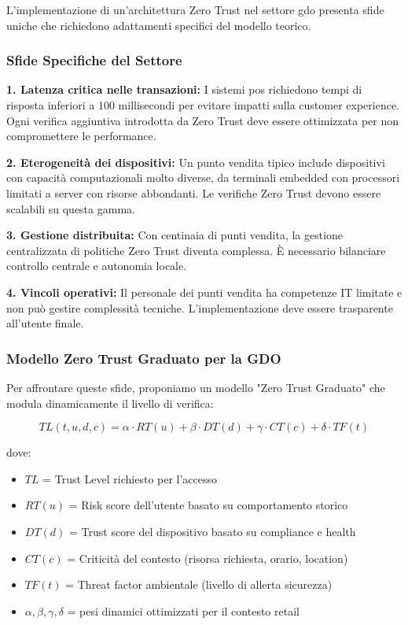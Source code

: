 L'implementazione di un'architettura Zero Trust nel settore \gls{gdo} presenta sfide uniche che richiedono adattamenti specifici del modello teorico.

\subsubsection{Sfide Specifiche del Settore}

\textbf{1. Latenza critica nelle transazioni:} I sistemi \gls{pos} richiedono tempi di risposta inferiori a 100 millisecondi per evitare impatti sulla customer experience. Ogni verifica aggiuntiva introdotta da Zero Trust deve essere ottimizzata per non compromettere le performance.

\textbf{2. Eterogeneità dei dispositivi:} Un punto vendita tipico include dispositivi con capacità computazionali molto diverse, da terminali embedded con processori limitati a server con risorse abbondanti. Le verifiche Zero Trust devono essere scalabili su questa gamma.

\textbf{3. Gestione distribuita:} Con centinaia di punti vendita, la gestione centralizzata di politiche Zero Trust diventa complessa. È necessario bilanciare controllo centrale e autonomia locale.

\textbf{4. Vincoli operativi:} Il personale dei punti vendita ha competenze IT limitate e non può gestire complessità tecniche. L'implementazione deve essere trasparente all'utente finale.

\subsubsection{Modello Zero Trust Graduato per la GDO}

Per affrontare queste sfide, proponiamo un modello "Zero Trust Graduato" che modula dinamicamente il livello di verifica:

\begin{equation}
TL(t, u, d, c) = \alpha \cdot RT(u) + \beta \cdot DT(d) + \gamma \cdot CT(c) + \delta \cdot TF(t)
\end{equation}

dove:
\begin{itemize}
\item $TL$ = Trust Level richiesto per l'accesso
\item $RT(u)$ = Risk score dell'utente basato su comportamento storico
\item $DT(d)$ = Trust score del dispositivo basato su compliance e health
\item $CT(c)$ = Criticità del contesto (risorsa richiesta, orario, location)
\item $TF(t)$ = Threat factor ambientale (livello di allerta sicurezza)
\item $\alpha, \beta, \gamma, \delta$ = pesi dinamici ottimizzati per il contesto retail
\end{itemize}

